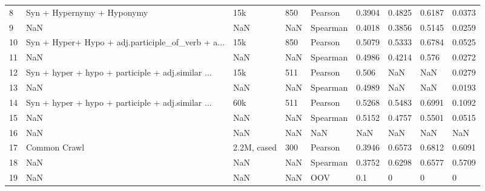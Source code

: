 \begin{table}
\begin{tabularx}{\textwidth}{*{9}{X}}
    8  &                         Syn + Hypernymy + Hyponymy &                                          15k &        850 &    Pearson &     0.3904 &     0.4825 &     0.6187 &      0.0373 \\
    9  &                                                NaN &                                          NaN &        NaN &   Spearman &     0.4018 &     0.3856 &     0.5145 &      0.0259 \\
    10 &  Syn + Hyper+ Hypo + adj.participle\_of\_verb + a... &                                          15k &        850 &    Pearson &     0.5079 &     0.5333 &     0.6784 &      0.0525 \\
    11 &                                                NaN &                                          NaN &        NaN &   Spearman &     0.4986 &     0.4214 &      0.576 &      0.0272 \\
    12 &  Syn + hyper + hypo + participle + adj.similar ... &                                          15k &        511 &    Pearson &      0.506 &        NaN &        NaN &      0.0279 \\
    13 &                                                NaN &                                          NaN &        NaN &   Spearman &     0.4989 &        NaN &        NaN &      0.0193 \\
    14 &  Syn + hyper + hypo + participle + adj.similar ... &                                          60k &        511 &    Pearson &     0.5268 &     0.5483 &     0.6991 &      0.1092 \\
    15 &                                                NaN &                                          NaN &        NaN &   Spearman &     0.5152 &     0.4757 &     0.5501 &      0.0515 \\
    16 &                                                NaN &                                          NaN &        NaN &        NaN &        NaN &        NaN &        NaN &         NaN \\
    17 &                                      Common Crawl  &                                  2.2M, cased &        300 &    Pearson &     0.3946 &     0.6573 &     0.6812 &      0.6091 \\
    18 &                                                NaN &                                          NaN &        NaN &   Spearman &     0.3752 &     0.6298 &     0.6577 &      0.5709 \\
    19 &                                                NaN &                                          NaN &        NaN &        OOV &        0.1 &          0 &          0 &           0 \\

\end{tabularx}
\end{table}
